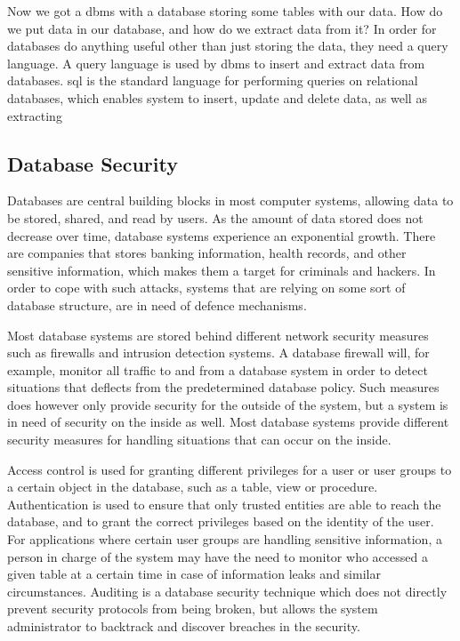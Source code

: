 Now we got a \gls{dbms} with a database storing some tables with our data. How do we put data in our database, and how do we extract data from it? In order for databases do anything useful other than just storing the data, they need a query language. A query language is used by \gls{dbms} to insert and extract data from databases. \gls{sql} is the standard language for performing queries on relational databases, which enables system to insert, update and delete data, as well as extracting 

\subsection{Database Security}
\label{chp:database_Security}

Databases are central building blocks in most computer systems, allowing data to be stored, shared, and read by users. As the amount of data stored does not decrease over time, database systems experience an exponential growth. There are companies that stores banking information, health records, and other sensitive information, which makes them a target for criminals and hackers. In order to cope with such attacks, systems that are relying on some sort of database structure, are in need of defence mechanisms. 


Most database systems are stored behind different network security measures such as firewalls and intrusion detection systems. A database firewall will, for example, monitor all traffic to and from a database system in order to detect situations that deflects from the predetermined database policy. Such measures does however only provide security for the outside of the system, but a system is in need of security on the inside as well. Most database systems provide different security measures for handling situations that can occur on the inside.

Access control is used for granting different privileges for a user or user groups to a certain object in the database, such as a table, view or procedure. Authentication is used to ensure that only trusted entities are able to reach the database, and to grant the correct privileges based on the identity of the user. For applications where certain user groups are handling sensitive information, a person in charge of the system may have the need to monitor who accessed a given table at a certain time in case of information leaks and similar circumstances. Auditing is a database security technique which does not directly prevent security protocols from being broken, but allows the system administrator to backtrack and discover breaches in the security.

